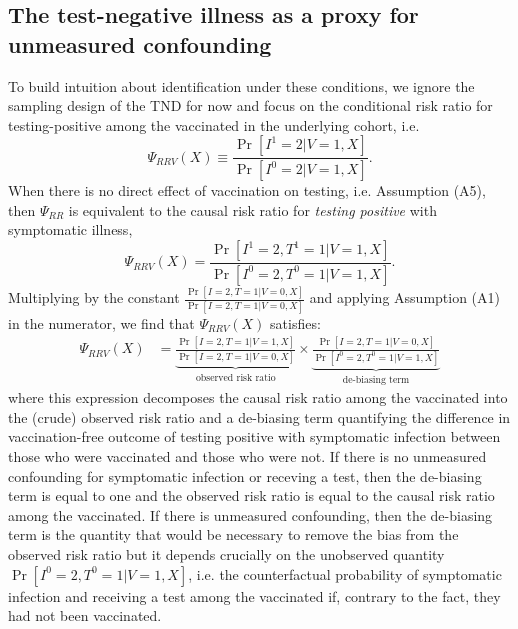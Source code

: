 \documentclass[11pt]{article}
\begin{document}
\subsection{The test-negative illness as a proxy for unmeasured confounding} \label{sec:effect_among_vaccinated}
To build intuition about identification under these conditions, we ignore the sampling design of the TND for now and focus on the conditional risk ratio for testing-positive among the vaccinated in the underlying cohort, i.e.
\begin{equation*}
    \Psi_{RRV}(X) \equiv  \frac{\Pr[I^1 = 2 | V = 1, X]}{\Pr[I^0 = 2 | V = 1, X]}.
\end{equation*}
When there is no direct effect of vaccination on testing, i.e. Assumption (A5), then $\Psi_{RR}$ is equivalent to the causal risk ratio for \textit{testing positive} with symptomatic illness,
\begin{equation*}
    \Psi_{RRV}(X)= \frac{\Pr[I^1 = 2, T^1 = 1 | V = 1, X]}{\Pr[I^0 = 2, T^0 = 1 | V = 1, X]}.
\end{equation*}
Multiplying by the constant $\frac{\Pr[I = 2, T = 1| V = 0, X]}{\Pr[I = 2, T = 1 | V = 0, X]}$ and applying Assumption (A1) in the numerator, we find that $\Psi_{RRV}(X)$ satisfies:
\begin{align} \label{eqn:decomposition}
    \Psi_{RRV}(X) &=\underbrace{\frac{\Pr[I = 2, T = 1 | V = 1, X]}{\Pr[I = 2, T = 1 | V = 0, X]}}_{\text{observed risk ratio}} \times \underbrace{\frac{\Pr[I = 2, T = 1 | V = 0, X]}{\Pr[I^0 = 2, T^0 = 1 | V = 1, X]}}_{\text{de-biasing term}} 
\end{align}
where this expression decomposes the causal risk ratio among the vaccinated into the (crude) observed risk ratio and a de-biasing term quantifying the difference in vaccination-free outcome of testing positive with symptomatic infection between those who were vaccinated and those who were not. If there is no unmeasured confounding for symptomatic infection or receving a test, then the de-biasing term is equal to one and the observed risk ratio is equal to the causal risk ratio among the vaccinated. If there is unmeasured confounding, then the de-biasing term is the quantity that would be necessary to remove the bias from the observed risk ratio but it depends crucially on the unobserved quantity $\Pr[I^0 = 2, T^0 = 1 | V = 1, X]$, i.e. the counterfactual probability of symptomatic infection and receiving a test among the vaccinated if, contrary to the fact, they had not been vaccinated. 
\end{document}
